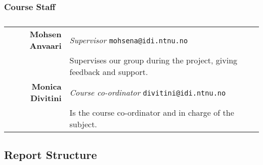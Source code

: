 \subsubsection{Course Staff}

\begin{table}[!ht]
\begin{tabular}{r|p{11cm}}
\textbf{Mohsen Anvaari} & \emph{Supervisor}   \texttt{mohsena@idi.ntnu.no}\\[6pt]
& Supervises our group during the project, giving feedback and support. \\[8pt]
\textbf{Monica Divitini} & \emph{Course co-ordinator}   \texttt{divitini@idi.ntnu.no}\\[6pt]
& Is the course co-ordinator and in charge of the subject.\\
\end{tabular}
\captionsetup{textformat=empty,labelformat=blank}
\caption[Course Staff]{}
\end{table}

\clearpage
\subsection{Report Structure}

